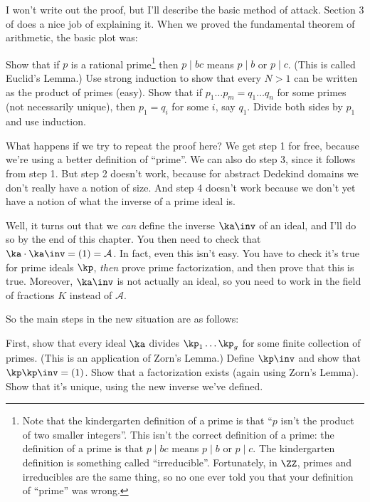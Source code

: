 I won't write out the proof, but I'll describe the basic method of attack.
Section 3 of \cite{ref:ullery} does a nice job of explaining it.
When we proved the fundamental theorem of arithmetic, the basic plot was:
\begin{enumerate}[(1)]
	\ii Show that if $p$ is a rational prime\footnote{Note
		that the kindergarten definition of a prime is
		that ``$p$ isn't the product of two smaller integers''.
		This isn't the correct definition of a prime:
		the definition of a prime is that $p \mid bc$
		means $p \mid b$ or $p \mid c$.
		The kindergarten definition is something called ``irreducible''.
		Fortunately, in $\ZZ$, primes and irreducibles are the same thing,
		so no one ever told you that your definition of ``prime'' was wrong.}
	then $p \mid bc$ means $p \mid b$ or $p \mid c$.  (This is called Euclid's Lemma.)
	\ii Use strong induction to show that every $N > 1$ can be written as the product of primes (easy).
	\ii Show that if $p_1 \dots p_m = q_1 \dots q_n$ for some primes (not necessarily unique),
	then $p_1 = q_i$ for some $i$, say $q_1$.
	\ii Divide both sides by $p_1$ and use induction.
\end{enumerate}
What happens if we try to repeat the proof here?
We get step 1 for free, because we're using a better definition of ``prime''.
We can also do step 3, since it follows from step 1.
But step 2 doesn't work,
because for abstract Dedekind domains
we don't really have a notion of size.
And step 4 doesn't work because we don't yet have a
notion of what the inverse of a prime ideal is.

Well, it turns out that we \emph{can} define the inverse $\ka\inv$ of an ideal,
and I'll do so by the end of this chapter.
You then need to check that $\ka \cdot \ka\inv = (1) = \mathcal A$.
In fact, even this isn't easy.
You have to check it's true for prime ideals $\kp$,
\emph{then} prove prime factorization,
and then prove that this is true.
Moreover, $\ka\inv$ is not actually an ideal, so you need to
work in the field of fractions $K$ instead of $\mathcal A$.

So the main steps in the new situation are as follows:
\begin{enumerate}[(1)]
	\ii First, show that every ideal $\ka$ divides $\kp_1 \dots \kp_g$
	for some finite collection of primes.
	(This is an application of Zorn's Lemma.)
	\ii Define $\kp\inv$ and show that $\kp \kp\inv = (1)$.
	\ii Show that a factorization exists (again using Zorn's Lemma).
	\ii Show that it's unique, using the new inverse we've defined.
\end{enumerate}

